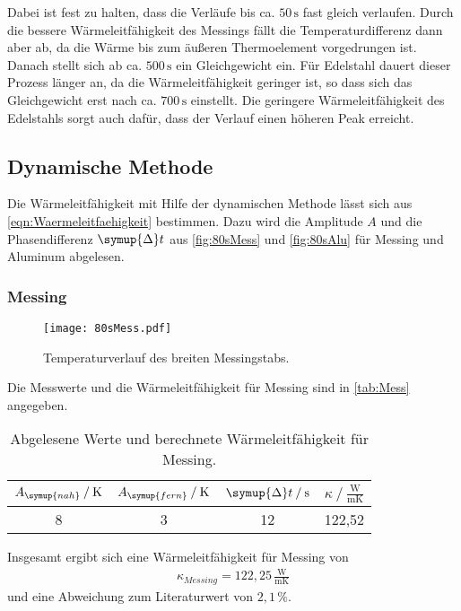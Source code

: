 Dabei ist fest zu halten, dass die Verläufe bis ca. $50\,\si{\second}$ fast gleich verlaufen.
Durch die bessere Wärmeleitfähigkeit des Messings fällt die Temperaturdifferenz dann aber ab, da die Wärme bis zum äußeren Thermoelement vorgedrungen ist. Danach
stellt sich ab ca. $500\,\si{\second}$ ein Gleichgewicht ein. Für Edelstahl dauert dieser Prozess länger an, da die Wärmeleitfähigkeit geringer ist, so dass sich
das Gleichgewicht erst nach ca. $700\,\si{\second}$ einstellt. Die geringere Wärmeleitfähigkeit des Edelstahls sorgt auch dafür, dass der Verlauf einen höheren Peak
erreicht.

\subsection{Dynamische Methode}
\label{dynam}
Die Wärmeleitfähigkeit mit Hilfe der dynamischen Methode lässt sich aus \autoref{eqn:Waermeleitfaehigkeit} bestimmen. Dazu wird die Amplitude $A$ und die Phasendifferenz
$\symup{\Delta} t$ aus \autoref{fig:80sMess} und \autoref{fig:80sAlu} für Messing und Aluminum abgelesen.

\subsubsection{Messing}

\begin{figure}[h]
  \centering
  \texttt{[image: 80sMess.pdf]}
  \caption{Temperaturverlauf des breiten Messingstabs.}
  \label{fig:80sMess}
\end{figure}

Die Messwerte und die Wärmeleitfähigkeit für Messing sind in \autoref{tab:Mess} angegeben.
\begin{table}[h]
  \centering
  \caption{Abgelesene Werte und berechnete Wärmeleitfähigkeit für Messing.}
  \label{tab:Mess}
  \begin{tabular}{c c c c}
    \toprule
    $A_{\symup{nah}}\mathbin{/}\si{\kelvin}$ & $A_{\symup{fern}}\mathbin{/}\si{\kelvin}$ & $\symup{\Delta}t\mathbin{/}\si{\second}$ & $\kappa\mathbin{/}\frac{\si{\watt}}{\si{\meter \kelvin}}$ \\
    \midrule
    8 & 3 & 12 & 122,52\\
    \bottomrule
  \end{tabular}
\end{table}

Insgesamt ergibt sich eine Wärmeleitfähigkeit für Messing von
\begin{align*}
  \kappa_{Messing} = 122,25\,\frac{\si{\watt}}{\si{\meter \kelvin}}
\end{align*}
und eine Abweichung zum Literaturwert von $2,1\,\%$.

